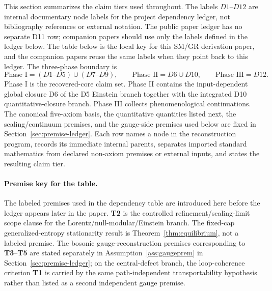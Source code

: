 \documentclass[11pt]{article}
\begin{document}
This section summarizes the claim tiers used throughout. The labels \(D1\)--\(D12\) are internal
documentary node labels for the project dependency ledger, not bibliography references or external
notation. The public paper ledger has no separate D11 row; companion papers should use
only the labels defined in the ledger below. The table below is the local key for this
SM/GR derivation paper, and the companion papers reuse the same labels when they point back to this ledger. The
three-phase boundary is
\[
\text{Phase I}=(D1\text{--}D5)\cup(D7\text{--}D9),\qquad
\text{Phase II}=D6\cup D10,\qquad
\text{Phase III}=D12.
\]
Phase I is the recovered-core claim set. Phase II contains the input-dependent global closure D6 of the D5 Einstein branch together with the integrated D10 quantitative-closure branch. Phase III collects phenomenological continuations. The canonical five-axiom basis, the quantitative quantities listed next, the scaling/continuum premises, and the gauge-side premises used below are fixed in Section~\ref{sec:premise-ledger}. Each row names a node in the reconstruction program, records its immediate internal parents, separates imported standard mathematics from declared non-axiom premises or external inputs, and states the resulting claim tier.

\paragraph{Premise key for the table.}
The labeled premises used in the dependency table are introduced here before the ledger appears later in the paper. \textbf{T2} is the controlled refinement/scaling-limit scope clause for the Lorentz/null-modular/Einstein branch. The fixed-cap generalized-entropy stationarity result is Theorem~\ref{thm:equilibrium}, not a labeled premise. The bosonic gauge-reconstruction premises corresponding to \textbf{T3}--\textbf{T5} are stated separately in Assumption~\ref{ass:gaugeprem} in Section~\ref{sec:premise-ledger}; on the central-defect branch, the loop-coherence criterion \textbf{T1} is carried by the same path-independent transportability hypothesis rather than listed as a second independent gauge premise.
\end{document}
